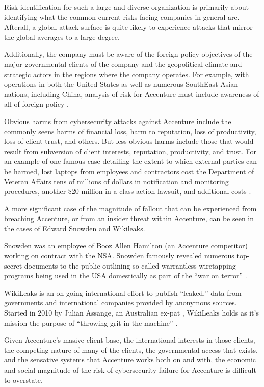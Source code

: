 Risk identification for such a large and diverse organization is primarily about identifying what the common current risks facing companies in general are. Afterall, a global attack surface is quite likely to experience attacks that mirror the global averages to a large degree.

Additionally, the company must be aware of the foreign policy objectives of the major governmental clients of the company and the geopolitical climate and strategic actors in the regions where the company operates. For example, with operations in both the United States as well as numerous SouthEast Asian nations, including China, analysis of risk for Accenture must include awareness of all of foreign policy \parencite{singhAmericanForeignPolicy2020,chapmanChinaEconomicSecurity2018}.

Obvious harms from cybersecurity attacks against Accenture include the commonly seens harms of financial loss, harm to reputation, loss of productivity, loss of client trust, and others. But less obvious harms include those that would result from subversion of client interests, reputation, productivity, and trust. For an example of one famous case detailing the extent to which external parties can be harmed, lost laptops from employees and contractors cost the Department of Veteran Affairs tens of millions of dollars in notification and monitoring procedures, another \$20 million in a class action lawsuit, and additional costs \parencite{nageshVALosesAnother2010}.

A more significant case of the magnitude of fallout that can be experienced from breaching Accenture, or from an insider threat within Accenture, can be seen in the cases of Edward Snowden and Wikileaks.

Snowden was an employee of Booz Allen Hamilton (an Accenture competitor) working on contract with the NSA. Snowden famously revealed numerous top-secret documents to the public outlining so-called warrantless-wiretapping programs being used in the USA domestically as part of the ``war on terror'' \parencite{greenwaldEdwardSnowdenWhistleblower2013}. 

WikiLeaks is an on-going international effort to publish ``leaked,'' data from governments and international companies provided by anonymous sources. Started in 2010 by Julian Assange, an Australian ex-pat , WikiLeaks holds as it's mission the purpose of ``throwing grit in the machine'' \parencite{zittrainEverythingYouNeed2010}.

Given Accenture's masive client base, the international interests in those clients, the competing nature of many of the clients, the governmental access that exists, and the sensative systems that Accenture works both on and with, the economic and social magnitude of the risk of cybersecurity failure for Accenture is difficult to overstate.

